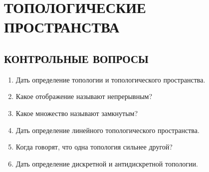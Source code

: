 \documentclass[12pt,a4paper]{article}
\begin{document}
\section{ТОПОЛОГИЧЕСКИЕ ПРОСТРАНСТВА}

\subsection*{КОНТРОЛЬНЫЕ ВОПРОСЫ}
\begin{enumerate}
\item Дать определение топологии и топологического пространства.
\item Какое отображение называют непрерывным?
\item Какое множество называют замкнутым?
\item Дать определение линейного топологического пространства.
\item Когда говорят, что одна топология сильнее другой?
\item Дать определение дискретной и антидискретной топологии.
\end{enumerate}
\end{document}
